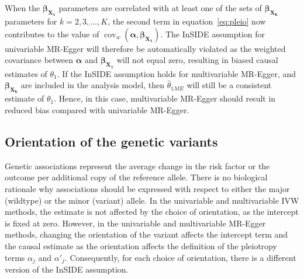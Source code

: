 \documentclass[a4paper,12pt]{article}
\DeclareMathOperator{\cov}{cov}
\begin{document}
\begin{bibunit}[wileyj]
When the $\boldsymbol{\beta_{X_{1}}}$ parameters are correlated with at least one of the sets of $\boldsymbol{\beta_{X_{k}}}$ parameters for $k = 2, 3, \ldots, K$, the second term in equation~\ref{eq:pleio} now contributes to the value of $\cov_w(\boldsymbol{\alpha},\boldsymbol{\beta_{X_{1}}})$. The InSIDE assumption for univariable MR-Egger will therefore be automatically violated as the weighted covariance between $\boldsymbol{\alpha}$ and $\boldsymbol{\beta_{X_{1}}}$ will not equal zero, resulting in biased causal estimates of $\theta_1$. If the InSIDE assumption holds for multivariable MR-Egger, and $\boldsymbol{\beta_{X_{k}}}$ are included in the analysis model, then $\hat{\theta}_{1ME}$ will still be a consistent estimate of $\theta_1$. Hence, in this case, multivariable MR-Egger should result in reduced bias compared with univariable MR-Egger.


\subsection{Orientation of the genetic variants}
\label{sec:orientation}
Genetic associations represent the average change in the risk factor or the outcome per additional copy of the reference allele. There is no biological rationale why associations should be expressed with respect to either the major (wildtype) or the minor (variant) allele. In the univariable and multivariable IVW methods, the estimate is not affected by the choice of orientation, as the intercept is fixed at zero. However, in the univariable and multivariable MR-Egger methods, changing the orientation of the variant affects the intercept term and the causal estimate as the orientation affects the definition of the pleiotropy terms $\alpha_j$ and $\alpha'_j$. Consequently, for each choice of orientation, there is a different version of the InSIDE assumption.


\end{bibunit}
\end{document}
